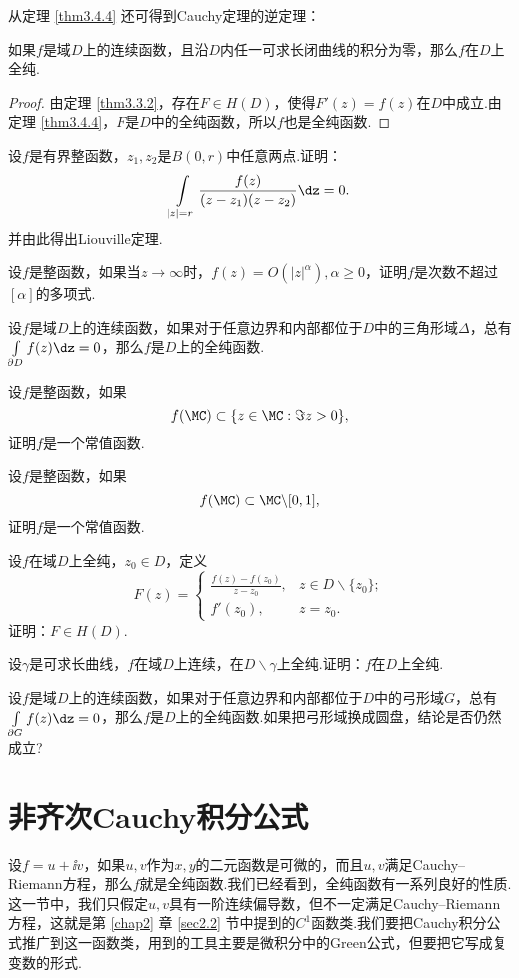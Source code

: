 从定理 \ref{thm3.4.4} 还可得到Cauchy定理的逆定理：
\begin{theorem}\label{thm3.5.4}
如果$f$是域$D$上的连续函数，且沿$D$内任一可求长闭曲线的积分为零，那么$f$在$D$上全纯.
\end{theorem}
\begin{proof}
由定理 \ref{thm3.3.2}，存在$F\in H(D)$，使得$F'(z)=f(z)$在$D$中成立.由定理 \ref{thm3.4.4}，$F$是$D$中的全纯函数，所以$f$也是全纯函数.
\end{proof}
\begin{xiti}
\item 设$f$是有界整函数，$z_1,z_2$是$B(0,r)$中任意两点.证明：
\[\int\limits_{|z|=r}\frac{f(z)}{(z-z_1)(z-z_2)}\dz=0.\]
并由此得出Liouville定理.
\item 设$f$是整函数，如果当$z\to\infty$时，$f(z)=O(|z|^\alpha),\alpha\ge0$，证明$f$是次数不超过$[\alpha]$的多项式.
\item 设$f$是域$D$上的连续函数，如果对于任意边界和内部都位于$D$中的三角形域$\varDelta$，总有$\int\limits_{\partial D}f(z)\dz=0$，那么$f$是$D$上的全纯函数.
\item 设$f$是整函数，如果
\[f(\MC)\subset\{z\in\MC:\Im z>0\},\]
证明$f$是一个常值函数.
\item 设$f$是整函数，如果
\[f(\MC)\subset \MC\backslash[0,1],\]
证明$f$是一个常值函数.
\item 设$f$在域$D$上全纯，$z_0\in D$，定义
\[F(z)=\begin{cases}
\frac{f(z)-f(z_0)}{z-z_0},&z\in D\backslash\{z_0\};\\
f'(z_0),&z=z_0.
\end{cases}\]
证明：$F\in H(D)$.
\item 设$\gamma$是可求长曲线，$f$在域$D$上连续，在$D\backslash\gamma$上全纯.证明：$f$在$D$上全纯.
\item 设$f$是域$D$上的连续函数，如果对于任意边界和内部都位于$D$中的弓形域$G$，总有$\int\limits_{\partial G}f(z)\dz=0$，那么$f$是$D$上的全纯函数.如果把弓形域换成圆盘，结论是否仍然成立?
\end{xiti}

\section{非齐次Cauchy积分公式\label{sec3.6}}
设$f=u+\ii v$，如果$u,v$作为$x,y$的二元函数是可微的，而且$u,v$满足Cauchy--Riemann方程，那么$f$就是全纯函数.我们已经看到，全纯函数有一系列良好的性质.这一节中，我们只假定$u,v$具有一阶连续偏导数，但不一定满足Cauchy--Riemann方程，这就是第 \ref{chap2} 章 \ref{sec2.2} 节中提到的$C^1$函数类.我们要把Cauchy积分公式推广到这一函数类，用到的工具主要是微积分中的Green公式，但要把它写成复变数的形式.

